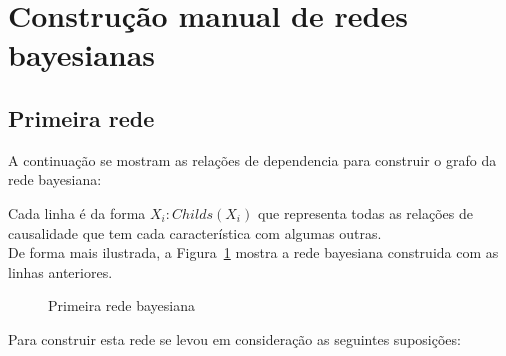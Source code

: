 \section{Construção manual de redes bayesianas}

\subsection{Primeira rede}
	A continuação se mostram as relações de dependencia para construir o grafo da rede bayesiana:
	\begin{comment}
	\begin{itemize}
		\item age: marital-status
		\item marital-status: workclass
		\item workclass: hours-per-week,capital-gain,capital-loss
		\item hours-per-week: annual-income
		\item native-country: race,occupation
		\item race: workclass
		\item sex: relationship,hours-per-week
		\item relationship: marital-status
		\item occupation: capital-gain,capital-loss
		\item education-num: education
		\item education: occupation
		\item capital-gain: annual-income
		\item capital-loss: annual-income
		\item annual-income:
	\end{itemize}
	\end{comment}
	Cada linha é da forma $X_i : Childs( X_i )$ que representa todas as relações de causalidade que tem cada característica com algumas outras.\\
	De forma mais ilustrada, a Figura~\ref{fig:rede1} mostra a rede bayesiana construida com as linhas anteriores.
	\begin{figure}[H]
		\centering
		
		\caption{Primeira rede bayesiana}
		\label{fig:rede1}
	\end{figure}
	Para construir esta rede se levou em consideração as seguintes suposições:
